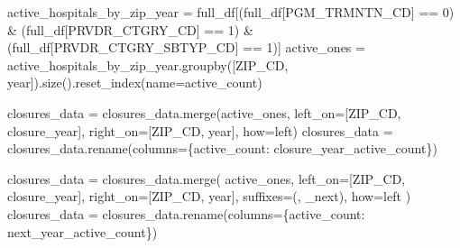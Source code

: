 \documentclass[
  letterpaper,
  DIV=11,
  numbers=noendperiod]{scrartcl}
\newenvironment{Shaded}{\begin{snugshade}}{\end{snugshade}}
\newcommand{\DecValTok}[1]{\textcolor[rgb]{0.68,0.00,0.00}{#1}}
\newcommand{\NormalTok}[1]{\textcolor[rgb]{0.00,0.23,0.31}{#1}}
\newcommand{\OperatorTok}[1]{\textcolor[rgb]{0.37,0.37,0.37}{#1}}
\newcommand{\StringTok}[1]{\textcolor[rgb]{0.13,0.47,0.30}{#1}}
\begin{document}
\begin{Shaded}
\begin{Highlighting}[]
\NormalTok{active\_hospitals\_by\_zip\_year }\OperatorTok{=}\NormalTok{ full\_df[(full\_df[}\StringTok{\textquotesingle{}PGM\_TRMNTN\_CD\textquotesingle{}}\NormalTok{] }\OperatorTok{==} \DecValTok{0}\NormalTok{) }\OperatorTok{\&} 
\NormalTok{                                       (full\_df[}\StringTok{\textquotesingle{}PRVDR\_CTGRY\_CD\textquotesingle{}}\NormalTok{] }\OperatorTok{==} \DecValTok{1}\NormalTok{) }\OperatorTok{\&} 
\NormalTok{                                       (full\_df[}\StringTok{\textquotesingle{}PRVDR\_CTGRY\_SBTYP\_CD\textquotesingle{}}\NormalTok{] }\OperatorTok{==} \DecValTok{1}\NormalTok{)]}
\NormalTok{active\_ones }\OperatorTok{=}\NormalTok{ active\_hospitals\_by\_zip\_year.groupby([}\StringTok{\textquotesingle{}ZIP\_CD\textquotesingle{}}\NormalTok{, }\StringTok{\textquotesingle{}year\textquotesingle{}}\NormalTok{]).size().reset\_index(name}\OperatorTok{=}\StringTok{\textquotesingle{}active\_count\textquotesingle{}}\NormalTok{)}

\NormalTok{closures\_data }\OperatorTok{=}\NormalTok{ closures\_data.merge(active\_ones, left\_on}\OperatorTok{=}\NormalTok{[}\StringTok{\textquotesingle{}ZIP\_CD\textquotesingle{}}\NormalTok{, }\StringTok{\textquotesingle{}closure\_year\textquotesingle{}}\NormalTok{], right\_on}\OperatorTok{=}\NormalTok{[}\StringTok{\textquotesingle{}ZIP\_CD\textquotesingle{}}\NormalTok{, }\StringTok{\textquotesingle{}year\textquotesingle{}}\NormalTok{], how}\OperatorTok{=}\StringTok{\textquotesingle{}left\textquotesingle{}}\NormalTok{)}
\NormalTok{closures\_data }\OperatorTok{=}\NormalTok{ closures\_data.rename(columns}\OperatorTok{=}\NormalTok{\{}\StringTok{\textquotesingle{}active\_count\textquotesingle{}}\NormalTok{: }\StringTok{\textquotesingle{}closure\_year\_active\_count\textquotesingle{}}\NormalTok{\})}

\NormalTok{closures\_data }\OperatorTok{=}\NormalTok{ closures\_data.merge(}
\NormalTok{    active\_ones,}
\NormalTok{    left\_on}\OperatorTok{=}\NormalTok{[}\StringTok{\textquotesingle{}ZIP\_CD\textquotesingle{}}\NormalTok{, }\StringTok{\textquotesingle{}closure\_year\textquotesingle{}}\NormalTok{],}
\NormalTok{    right\_on}\OperatorTok{=}\NormalTok{[}\StringTok{\textquotesingle{}ZIP\_CD\textquotesingle{}}\NormalTok{, }\StringTok{\textquotesingle{}year\textquotesingle{}}\NormalTok{],}
\NormalTok{    suffixes}\OperatorTok{=}\NormalTok{(}\StringTok{\textquotesingle{}\textquotesingle{}}\NormalTok{, }\StringTok{\textquotesingle{}\_next\textquotesingle{}}\NormalTok{),}
\NormalTok{    how}\OperatorTok{=}\StringTok{\textquotesingle{}left\textquotesingle{}}
\NormalTok{)}
\NormalTok{closures\_data }\OperatorTok{=}\NormalTok{ closures\_data.rename(columns}\OperatorTok{=}\NormalTok{\{}\StringTok{\textquotesingle{}active\_count\textquotesingle{}}\NormalTok{: }\StringTok{\textquotesingle{}next\_year\_active\_count\textquotesingle{}}\NormalTok{\})}


\end{Highlighting}
\end{Shaded}
\end{document}
